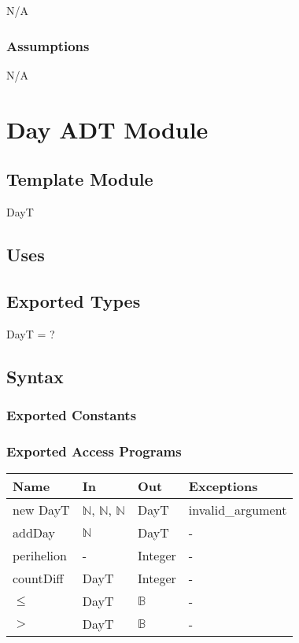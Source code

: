 \documentclass[12pt, titlepage]{article}
\begin{document}
N/A\\

\subsubsection{Assumptions}
N/A\\

\newpage


\section{Day ADT Module} \label{ModuleADTD} 

\subsection{Template Module}
DayT

\subsection{Uses}



\subsection{Exported Types}

DayT = ? \\

\subsection{Syntax}

\subsubsection{Exported Constants}


\subsubsection{Exported Access Programs}

\begin{center}
\begin{tabular}{p{3cm} p{5cm} p{4cm} p{2cm}}
\hline
\textbf{Name} & \textbf{In} & \textbf{Out} & \textbf{Exceptions} \\
\hline
new DayT& $\mathbb{N}$, $\mathbb{N}$, $\mathbb{N}$ & DayT & invalid\_argument \\
addDay &  $\mathbb{N}$  & DayT & - \\
perihelion &  -  & Integer & - \\
countDiff &  DayT  & Integer & - \\
$\leq$ &  DayT  & $\mathbb{B}$ & - \\
$>$ &  DayT  & $\mathbb{B}$ & - \\
\hline
\end{tabular}
\end{center}
\end{document}
